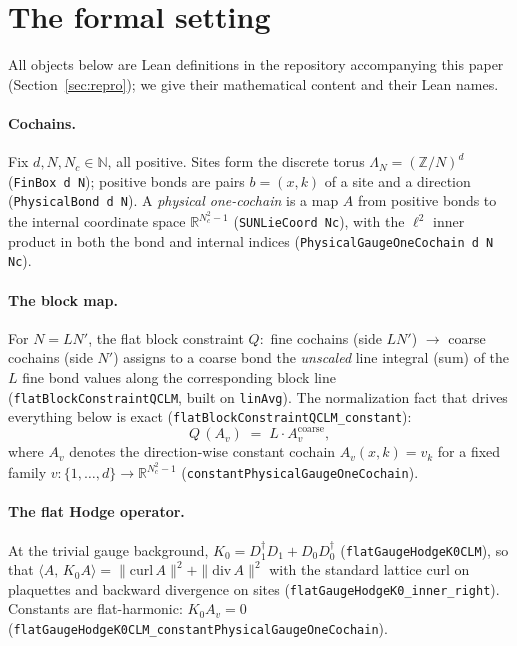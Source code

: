 \documentclass[11pt]{article}
\theoremstyle{definition}
\newcommand{\lean}[1]{\texttt{#1}}
\newcommand{\R}{\mathbb{R}}
\newcommand{\Z}{\mathbb{Z}}
\newcommand{\inn}[2]{\langle #1,\, #2\rangle}
\begin{document}
\section{The formal setting}\label{sec:setting}

All objects below are Lean definitions in the repository accompanying
this paper (Section~\ref{sec:repro}); we give their mathematical content
and their Lean names.

\paragraph{Cochains.}  Fix $d,N,N_c\in\mathbb{N}$, all positive.  Sites
form the discrete torus $\Lambda_N=(\Z/N)^d$
(\lean{FinBox d N}); positive bonds are pairs $b=(x,k)$ of a site and a
direction (\lean{PhysicalBond d N}).  A \emph{physical one-cochain} is a
map $A$ from positive bonds to the internal coordinate space
$\R^{N_c^2-1}$ (\lean{SUNLieCoord Nc}), with the $\ell^2$ inner product
in both the bond and internal indices
(\lean{PhysicalGaugeOneCochain d N Nc}).

\paragraph{The block map.}  For $N=LN'$, the flat block constraint
$Q\colon$ fine cochains (side $LN'$) $\to$ coarse cochains (side $N'$)
assigns to a coarse bond the \emph{unscaled} line integral (sum) of the
$L$ fine bond values along the corresponding block line
(\lean{flatBlockConstraintQCLM}, built on \lean{linAvg}).  The
normalization fact that drives everything below is exact
(\lean{flatBlockConstraintQCLM\_constant}):
\begin{equation}\label{eq:Qconst}
Q\,(A_v) \;=\; L\cdot A^{\mathrm{coarse}}_v,
\end{equation}
where $A_v$ denotes the direction-wise constant cochain
$A_v(x,k) = v_k$ for a fixed family $v\colon \{1,\dots,d\}\to\R^{N_c^2-1}$
(\lean{constantPhysicalGaugeOneCochain}).

\paragraph{The flat Hodge operator.}  At the trivial gauge background,
$K_0 = D_1^{\dagger}D_1 + D_0 D_0^{\dagger}$
(\lean{flatGaugeHodgeK0CLM}), so that
$\inn{A}{K_0 A} = \|\mathrm{curl}\,A\|^2 + \|\mathrm{div}\,A\|^2$ with
the standard lattice curl on plaquettes and backward divergence on sites
(\lean{flatGaugeHodgeK0\_inner\_right}).  Constants are flat-harmonic:
$K_0 A_v = 0$
(\lean{flatGaugeHodgeK0CLM\_constantPhysicalGaugeOneCochain}).
\end{document}

